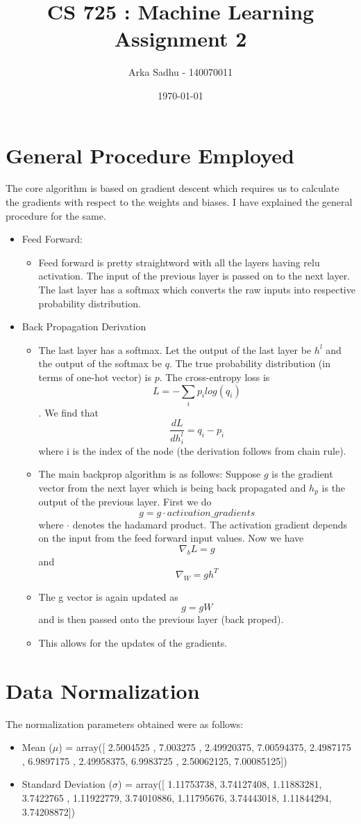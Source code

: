 \documentclass{article}
\title{CS 725 : Machine Learning Assignment 2}
\author{Arka Sadhu - 140070011}
\date{\today}
\begin{document}
\maketitle

\section{General Procedure Employed}
The core algorithm is based on gradient descent which requires us to calculate the gradients with respect to the weights and biases. I have explained the general procedure for the same.

\begin{itemize}
\item Feed Forward:
  \begin{itemize}
  \item Feed forward is pretty straightword with all the layers having relu activation. The input of the previous layer is passed on to the next layer. The last layer has a softmax which converts the raw inputs into respective probability distribution.
  \end{itemize}
\item Back Propagation Derivation
  \begin{itemize}
  \item The last layer has a softmax. Let the output of the last layer be $h^l$ and the output of the softmax be $q$. The true probability distribution (in terms of one-hot vector) is $p$. The cross-entropy loss is $$L = - \sum_i p_i log(q_i)$$. We find that $$\frac{dL}{dh_i^l} = q_i - p_i$$ where i is the index of the node (the derivation follows from chain rule).
  \item The main backprop algorithm is as follows:
    Suppose $g$ is the gradient vector from the next layer which is being back propagated and $h_p$ is the output of the previous layer. First we do $$g = g \cdot activation\_gradients$$ where $\cdot$ denotes the hadamard product. The activation gradient depends on the input from the feed forward input values. Now we have $$\nabla_bL = g$$ and $$\nabla_W = gh^T$$
  \item The g vector is again updated as $$g = g W$$ and is then passed onto the previous layer (back proped).
  \item This allows for the updates of the gradients.
  \end{itemize}
\end{itemize}


\section{Data Normalization}
The normalization parameters obtained were as follows:
\begin{itemize}
\item Mean ($\mu$) = array([ 2.5004525 ,  7.003275  ,  2.49920375,  7.00594375,  2.4987175 , 6.9897175 ,  2.49958375,  6.9983725 ,  2.50062125,  7.00085125])
\item Standard Deviation ($\sigma$) = array([ 1.11753738,  3.74127408,  1.11883281,  3.7422765 ,  1.11922779,
  3.74010886,  1.11795676,  3.74443018,  1.11844294,  3.74208872])
\end{itemize}
\end{document}
